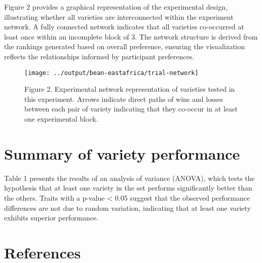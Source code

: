 \documentclass[
]{article}
\begin{document}
Figure 2 provides a graphical representation of the experimental design,
illustrating whether all varieties are interconnected within the
experiment network. A fully connected network indicates that all
varieties co-occurred at least once within an incomplete block of 3. The
network structure is derived from the rankings generated based on
overall preference, ensuring the visualization reflects the
relationships informed by participant preferences.

\begin{figure}
\texttt{[image: ../output/bean-eastafrica/trial-network]} \caption{Figure 2. Experimental network representation of varieties tested in this experiment. Arrows indicate direct paths of wins and losses between each pair of variety indicating that they co-occur in at least one experimental block.}\label{fig:trial_network}
\end{figure}

\section{Summary of variety
performance}\label{summary-of-variety-performance}

Table 1 presents the results of an analysis of variance (ANOVA), which
tests the hypothesis that at least one variety in the set performs
significantly better than the others. Traits with a p-value \textless{}
0.05 suggest that the observed performance differences are not due to
random variation, indicating that at least one variety exhibits superior
performance.

\section{References}\label{references}
\end{document}

